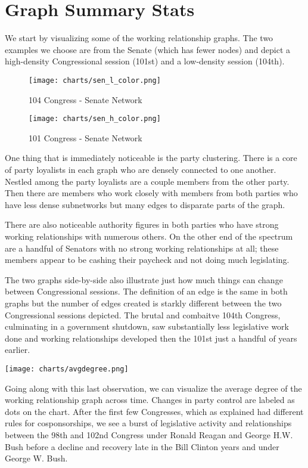 \section{Graph Summary Stats}

We start by visualizing some of the working relationship graphs. The two
examples we choose are from the Senate (which has fewer nodes) and depict a
high-density Congressional session (101st) and a low-density session (104th).

\begin{figure}[htbp]
  \centering
  \begin{minipage}[h]{0.25\textwidth}
    \texttt{[image: charts/sen\_l\_color.png]}
    \caption*{104 Congress - Senate Network}
  \end{minipage}
  \hfill
  \begin{minipage}[h]{0.25\textwidth}
    \texttt{[image: charts/sen\_h\_color.png]}
    \caption*{101 Congress - Senate Network}
  \end{minipage}
\end{figure}

One thing that is immediately noticeable is the party clustering. There is a
core of party loyalists in each graph who are densely connected to one another.
Nestled among the party loyalists are a couple members from the other party.
Then there are members who work closely with members from both parties who have
less dense subnetworks but many edges to disparate parts of the graph.

There are also noticeable authority figures in both parties who have strong
working relationships with numerous others. On the other end of the spectrum are
a handful of Senators with no strong working relationships at all; these members
appear to be cashing their paycheck and not doing much legislating.

The two graphs side-by-side also illustrate just how much things can change
between Congressional sessions. The definition of an edge is the same in both
graphs but the number of edges created is starkly different between the two
Congressional sessions depicted. The brutal and combaitve 104th Congress,
culminating in a government shutdown, saw substantially less legislative work
done and working relationships developed then the 101st just a handful of years
earlier.

\texttt{[image: charts/avgdegree.png]}

Going along with this last observation, we can visualize the average degree of
the working relationship graph across time. Changes in party control are labeled
as dots on the chart. After the first few Congresses, which as explained had
different rules for cosponsorships, we see a burst of legislative activity and
relationships between the 98th and 102nd Congress under Ronald Reagan and George
H.W. Bush before a decline and recovery late in the Bill Clinton years and under
George W. Bush.

